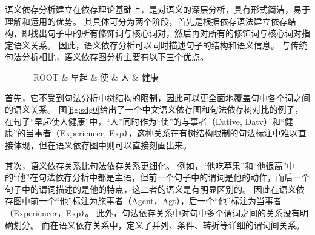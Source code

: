 语义依存分析建立在依存理论基础上，是对语义的深层分析，具有形式简洁，易于理解和运用的优势。
其具体可分为两个阶段，首先是根据依存语法建立依存结构，即找出句子中的所有修饰词与核心词对，然后再对所有的修饰词与核心词对指定语义关系。
因此，语义依存分析可以同时描述句子的结构和语义信息。
与传统句法分析相比，语义依存图分析主要有以下三个优点。


\begin{figure}[htpb]
	\begin{center}
			\begin{dependency}[arc edge, arc angle=80, text only label, label style={above}]
				\begin{deptext} [row sep=0.6cm, column sep=.5cm]
					\ ROOT \& 早起 \& 使 \& 人 \&  健康 \\
				\end{deptext}
				
			\end{dependency}
	\end{center}
\end{figure}


首先，它不受到句法分析中树结构的限制，因此可以更全面地覆盖句中各个词之间的语义关系。
图\ref{fig:sdg0}给出了一个中文语义依存图和句法依存树对比的例子，在句子“早起使人健康”中，“人”同时作为“使”的与事者（Dative, Datv）和“健康”的当事者（Experiencer, Exp），这种关系在有树结构限制的句法标注中难以直接体现，但在语义依存图中则可以直接刻画出来。

其次，语义依存关系比句法依存关系更细化。
例如，“他吃苹果”和“他很高”中的“他”在句法依存分析中都是主语，但前一个句子中的谓词是他的动作，而后一个句子中的谓词描述的是他的特点，这二者的语义是有明显区别的。
因此在语义依存图中前一个“他”标注为施事者（Agent，Agt），后一个“他”标注为当事者（Experiencer，Exp）。
此外，句法依存关系中对句中多个谓词之间的关系没有明确划分。
而在语义依存关系中，定义了并列、条件、转折等详细的谓词间关系。

